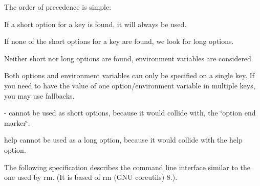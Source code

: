 The order of precedence is simple\+:


\begin{DoxyItemize}
\item If a short option for a key is found, it will always be used.
\item If none of the short options for a key are found, we look for long options.
\item Neither short nor long options are found, environment variables are considered.
\end{DoxyItemize}


\begin{DoxyItemize}
\item Both options and environment variables can only be specified on a single key. If you need to have the value of one option/environment variable in multiple keys, you may use {\ttfamily fallback}s.
\item {\ttfamily -\/} cannot be used as short options, because it would collide with, the \char`\"{}option end marker\char`\"{}.
\item {\ttfamily help} cannot be used as a long option, because it would collide with the help option.
\end{DoxyItemize}

The following specification describes the command line interface similar to the one used by {\ttfamily rm}. (It is based of {\ttfamily rm (G\+NU coreutils) 8.}).


